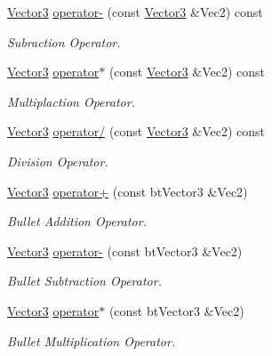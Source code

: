 \begin{DoxyCompactItemize}
\hyperlink{classphys_1_1Vector3}{Vector3} \hyperlink{classphys_1_1Vector3_aed320f9ac1374c0955a20aef50c05751}{operator-\/} (const \hyperlink{classphys_1_1Vector3}{Vector3} \&Vec2) const 
\begin{DoxyCompactList}\small\item\em Subraction Operator. \item\end{DoxyCompactList}\item 
\hyperlink{classphys_1_1Vector3}{Vector3} \hyperlink{classphys_1_1Vector3_aa148f18ae4cae10a4aae4170351d7c11}{operator$\ast$} (const \hyperlink{classphys_1_1Vector3}{Vector3} \&Vec2) const 
\begin{DoxyCompactList}\small\item\em Multiplaction Operator. \item\end{DoxyCompactList}\item 
\hyperlink{classphys_1_1Vector3}{Vector3} \hyperlink{classphys_1_1Vector3_af8db5066a9509a5d1b7d568ef576dc6e}{operator/} (const \hyperlink{classphys_1_1Vector3}{Vector3} \&Vec2) const 
\begin{DoxyCompactList}\small\item\em Division Operator. \item\end{DoxyCompactList}\item 
\hyperlink{classphys_1_1Vector3}{Vector3} \hyperlink{classphys_1_1Vector3_a70c99d125274635b07b0fe90bcc15a8c}{operator+} (const btVector3 \&Vec2)
\begin{DoxyCompactList}\small\item\em Bullet Addition Operator. \item\end{DoxyCompactList}\item 
\hyperlink{classphys_1_1Vector3}{Vector3} \hyperlink{classphys_1_1Vector3_ab7ec10d90e35c2b153a2f002f12518ce}{operator-\/} (const btVector3 \&Vec2)
\begin{DoxyCompactList}\small\item\em Bullet Subtraction Operator. \item\end{DoxyCompactList}\item 
\hyperlink{classphys_1_1Vector3}{Vector3} \hyperlink{classphys_1_1Vector3_a59f8b8d5c15f4b047100480ad26ba092}{operator$\ast$} (const btVector3 \&Vec2)
\begin{DoxyCompactList}\small\item\em Bullet Multiplication Operator. \item\end{DoxyCompactList}\item 

\end{DoxyCompactItemize}
